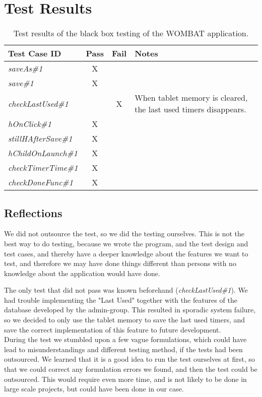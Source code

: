 \section{Test Results}
	
	\begin{table}[width=\textwidth]
		\begin{center}
			\begin{tabular}{|l|c|c|p{6cm}|}
				\hline
				\textbf{Test Case ID} & \textbf{Pass} & \textbf{Fail} & \textbf{Notes} \\
				\hline
				\textit{saveAs\#1} & X &  &  \\
				\hline
				\textit{save\#1} & X &  &  \\
				\hline
				\textit{checkLastUsed\#1} &  & X & When tablet memory is cleared, the last used timers disappears. \\
				\hline
				\textit{hOnClick\#1} & X &  &  \\
				\hline
				\textit{stillHAfterSave\#1} & X &  &  \\
				\hline
				\textit{hChildOnLaunch\#1} & X &  &  \\
				\hline
				\textit{checkTimerTime\#1} & X &  &  \\
				\hline
				\textit{checkDoneFunc\#1} & X &  &  \\
				\hline
			\end{tabular}
			\caption{Test results of the black box testing of the WOMBAT application.}
			\label{tab:bb_test_results}
		\end{center}
	\end{table}

\subsection{Reflections}
We did not outsource the test, so we did the testing ourselves. This is not the best way to do testing, because we wrote the program, and the test design and test cases, and thereby have a deeper knowledge about the features we want to test, and therefore we may have done things different than persons with no knowledge about the application would have done.

The only test that did not pass was known beforehand (\textit{checkLastUsed\#1}). We had trouble implementing the "Last Used" together with the features of the database developed by the admin-group. This resulted in sporadic system failure, so we decided to only use the tablet memory to save the last used timers, and save the correct implementation of this feature to future development.\\

During the test we stumbled upon a few vague formulations, which could have lead to misunderstandings and different testing method, if the tests had been outsourced. We learned that it is a good idea to run the test ourselves at first, so that we could correct any formulation errors we found, and then the test could be outsourced. This would require even more time, and is not likely to be done in large scale projects, but could have been done in our case.